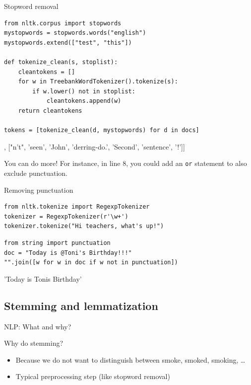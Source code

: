 \documentclass[compress]{beamer}
\begin{document}
\begin{frame}[fragile]{Stopword removal}
\begin{lstlisting}
from nltk.corpus import stopwords
mystopwords = stopwords.words("english")
mystopwords.extend(["test", "this"])

def tokenize_clean(s, stoplist):
    cleantokens = []
    for w in TreebankWordTokenizer().tokenize(s):
        if w.lower() not in stoplist:
            cleantokens.append(w)
    return cleantokens

tokens = [tokenize_clean(d, mystopwords) for d in docs]
\end{lstlisting}
\begin{lstlistingoutputtiny}
[['text'], ["n't", 'seen', 'John', 'derring-do.', 'Second', 'sentence', '!']]
\end{lstlistingoutputtiny}

\begin{alertblock}{You can do more!}
\tiny{For instance, in line 8, you could add an \texttt{or} statement to also exclude punctuation.}
\end{alertblock}

\end{frame}


\begin{frame}[fragile]{Removing punctuation}
\begin{lstlisting}
from nltk.tokenize import RegexpTokenizer
tokenizer = RegexpTokenizer(r'\w+')
tokenizer.tokenize("Hi teachers, what's up!")
\end{lstlisting}  
\begin{lstlistingoutputtiny}
\end{lstlistingoutputtiny}
\begin{lstlisting}
from string import punctuation
doc = "Today is @Toni's Birthday!!!"
"".join([w for w in doc if w not in punctuation])
\end{lstlisting}  
\begin{lstlistingoutputtiny}
'Today is Tonis Birthday'
\end{lstlistingoutputtiny}

\end{frame}


\subsection{Stemming and lemmatization}


\begin{frame}{NLP: What and why?}
\begin{block}{Why do stemming?}
	\begin{itemize}
		\item Because we do not want to distinguish between smoke, smoked, smoking, \ldots
		\item Typical preprocessing step (like stopword removal)
	\end{itemize}
\end{block}
\end{frame}
\end{document}
